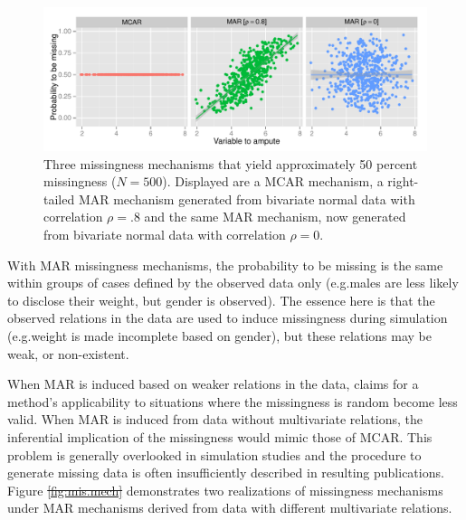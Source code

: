 \documentclass[ %
]{article} %
\providecommand{\DIFaddtex}[1]{{\protect\color{blue}\uwave{#1}}} %
\providecommand{\DIFdeltex}[1]{{\protect\color{red}\sout{#1}}}                      %
\providecommand{\DIFaddbegin}{} %
\providecommand{\DIFaddend}{} %
\providecommand{\DIFdelbegin}{} %
\providecommand{\DIFdelend}{} %
\providecommand{\DIFaddFL}[1]{\DIFadd{#1}} %
\providecommand{\DIFdelFL}[1]{\DIFdel{#1}} %
\providecommand{\DIFaddbeginFL}{} %
\providecommand{\DIFaddendFL}{} %
\providecommand{\DIFdelbeginFL}{} %
\providecommand{\DIFdelendFL}{} %
\providecommand{\DIFadd}[1]{\texorpdfstring{\DIFaddtex{#1}}{#1}} %
\providecommand{\DIFdel}[1]{\texorpdfstring{\DIFdeltex{#1}}{}} %
\newcommand{\DIFscaledelfig}{0.5}
\newlength{\DIFdelgraphicswidth} %
\newlength{\DIFdelgraphicsheight} %
\newcommand{\DIFaddincludegraphics}[2][]{{\color{blue}\fbox{\DIFOincludegraphics[#1]{#2}}}} %
\newcommand{\DIFdelincludegraphics}[2][]{%
\sbox{\DIFdelgraphicsbox}{\DIFOincludegraphics[#1]{#2}}%
\settoboxwidth{\DIFdelgraphicswidth}{\DIFdelgraphicsbox} %
\settoboxtotalheight{\DIFdelgraphicsheight}{\DIFdelgraphicsbox} %
\scalebox{\DIFscaledelfig}{%
\parbox[b]{\DIFdelgraphicswidth}{\usebox{\DIFdelgraphicsbox}\\[-\baselineskip] \rule{\DIFdelgraphicswidth}{0em}}\llap{\resizebox{\DIFdelgraphicswidth}{\DIFdelgraphicsheight}{%
\setlength{\unitlength}{\DIFdelgraphicswidth}%
\begin{picture}(1,1)%
\thicklines\linethickness{2pt} %
{\color[rgb]{1,0,0}\put(0,0){\framebox(1,1){}}}%
{\color[rgb]{1,0,0}\put(0,0){\line( 1,1){1}}}%
{\color[rgb]{1,0,0}\put(0,1){\line(1,-1){1}}}%
\end{picture}%
}\hspace*{3pt}}} %
} %
\DeclareRobustCommand{\DIFaddbegin}{\DIFOaddbegin \let\includegraphics\DIFaddincludegraphics} %
\DeclareRobustCommand{\DIFaddend}{\DIFOaddend \let\includegraphics\DIFOincludegraphics} %
\DeclareRobustCommand{\DIFdelbegin}{\DIFOdelbegin \let\includegraphics\DIFdelincludegraphics} %
\DeclareRobustCommand{\DIFdelend}{\DIFOaddend \let\includegraphics\DIFOincludegraphics} %
\DeclareRobustCommand{\DIFaddbeginFL}{\DIFOaddbeginFL \let\includegraphics\DIFaddincludegraphics} %
\DeclareRobustCommand{\DIFaddendFL}{\DIFOaddendFL \let\includegraphics\DIFOincludegraphics} %
\DeclareRobustCommand{\DIFdelbeginFL}{\DIFOdelbeginFL \let\includegraphics\DIFdelincludegraphics} %
\DeclareRobustCommand{\DIFdelendFL}{\DIFOaddendFL \let\includegraphics\DIFOincludegraphics} %
\begin{document}
\begin{figure}
\centering
\includegraphics{img/plot_mmech.pdf}
\DIFaddendFL \caption{\DIFaddbeginFL \label{fig:mis_mech}\DIFaddendFL Three missingness mechanisms that yield
approximately 50 percent missingness (\DIFdelbeginFL \DIFdelFL{$N=500$}\DIFdelendFL \DIFaddbeginFL \DIFaddFL{\(N=500\)}\DIFaddendFL ). Displayed are a MCAR
mechanism, a right-tailed MAR mechanism generated from bivariate normal
data with correlation \DIFdelbeginFL \DIFdelFL{$\rho=.8$ }\DIFdelendFL \DIFaddbeginFL \DIFaddFL{\(\rho=.8\) }\DIFaddendFL and the same MAR mechanism, now
generated from bivariate normal data with correlation \DIFdelbeginFL \DIFdelFL{$\rho= 0$}\DIFdelendFL \DIFaddbeginFL \DIFaddFL{\(\rho= 0\)}\DIFaddendFL .}
\DIFdelbeginFL %
\DIFdelendFL \end{figure}

With MAR missingness mechanisms, the probability to be missing is the
same within groups of cases defined by the observed data only
(e.g.\DIFaddbegin \DIFadd{~}\DIFaddend males are less likely to disclose their weight, but gender is
observed). The essence here is that the observed relations in the data
are used to induce missingness during simulation (e.g.\DIFaddbegin \DIFadd{~}\DIFaddend weight is made
incomplete based on gender), but these relations may be weak, or
non-existent.

When MAR is induced based on weaker relations in the data, claims for a
method's applicability to situations where the missingness is random
become less valid. When MAR is induced from data without multivariate
relations, the inferential implication of the missingness would mimic
those of MCAR. This problem is generally overlooked in simulation
studies and the procedure to generate missing data is often
insufficiently described in resulting publications. Figure
\DIFdelbegin \DIFdel{\ref{fig:mis.mech} }\DIFdelend \DIFaddbegin \DIFadd{\ref{fig:mis_mech} }\DIFaddend demonstrates two realizations of missingness
mechanisms under MAR mechanisms derived from data with different
multivariate relations.
\end{document}
